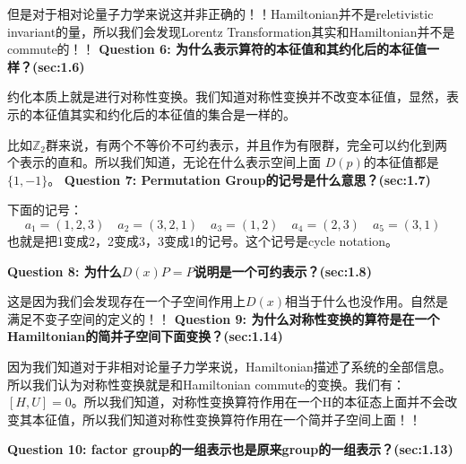 但是对于相对论量子力学来说这并非正确的！！Hamiltonian并不是reletivistic invariant的量，所以我们会发现Lorentz Transformation其实和Hamiltonian并不是commute的！！
\line
\textbf{Question 6: 为什么表示算符的本征值和其约化后的本征值一样？(sec:1.6)}

约化本质上就是进行对称性变换。我们知道对称性变换并不改变本征值，显然，表示的本征值其实和约化后的本征值的集合是一样的。

比如$ \mathbb{Z}_2 $群来说，有两个不等价不可约表示，并且作为有限群，完全可以约化到两个表示的直和。所以我们知道，无论在什么表示空间上面 $ D(p) $的本征值都是$ \{1,-1\} $。
\line
\textbf{Question 7: Permutation Group的记号是什么意思？(sec:1.7)}

下面的记号：
\begin{equation}
  a_1=(1,2,3)\quad a_2=(3,2,1)\quad a_3=(1,2)\quad a_4=(2,3)\quad a_5=(3,1)
  \label{eq:permutationgroupnotation}
\end{equation}
也就是把1变成2，2变成3，3变成1的记号。这个记号是cycle notation。

\line
\textbf{Question 8: 为什么$ D(x)P = P $说明是一个可约表示？(sec:1.8)}

这是因为我们会发现存在一个子空间作用上$ D(x) $相当于什么也没作用。自然是满足不变子空间的定义的！！
\line
\textbf{Question 9: 为什么对称性变换的算符是在一个Hamiltonian的简并子空间下面变换？(sec:1.14)}

因为我们知道对于非相对论量子力学来说，Hamiltonian描述了系统的全部信息。所以我们认为对称性变换就是和Hamiltonian commute的变换。我们有：$ [H,U] = 0 $。所以我们知道，对称性变换算符作用在一个H的本征态上面并不会改变其本征值，所以我们知道对称性变换算符作用在一个简并子空间上面！！

\line
\textbf{Question 10: factor group的一组表示也是原来group的一组表示？(sec:1.13)}

